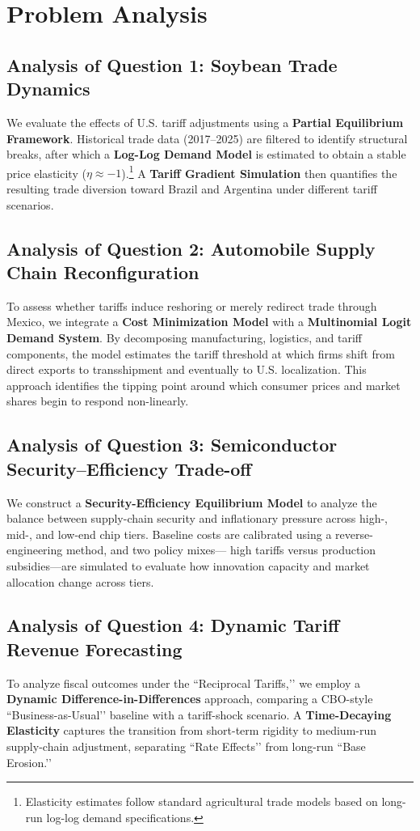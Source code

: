 \documentclass{apmcmthesis}
\begin{document}
\section{Problem Analysis}

\subsection{Analysis of Question 1: Soybean Trade Dynamics}
We evaluate the effects of U.S. tariff adjustments using a 
\textbf{Partial Equilibrium Framework}. Historical trade data (2017–2025) are filtered to
identify structural breaks, after which a \textbf{Log-Log Demand Model} is estimated to obtain a 
stable price elasticity ($\eta \approx -1$).\footnote{Elasticity estimates follow standard
agricultural trade models based on long-run log-log demand specifications.} 
A \textbf{Tariff Gradient Simulation} then quantifies the resulting trade diversion toward Brazil
and Argentina under different tariff scenarios.

\subsection{Analysis of Question 2: Automobile Supply Chain Reconfiguration}
To assess whether tariffs induce reshoring or merely redirect trade through Mexico, we integrate a 
\textbf{Cost Minimization Model} with a \textbf{Multinomial Logit Demand System}. 
By decomposing manufacturing, logistics, and tariff components, the model estimates the tariff 
threshold at which firms shift from direct exports to transshipment and eventually to U.S. 
localization. This approach identifies the tipping point around which consumer prices and market
shares begin to respond non-linearly.

\subsection{Analysis of Question 3: Semiconductor Security–Efficiency Trade-off}
We construct a \textbf{Security-Efficiency Equilibrium Model} to analyze the balance between 
supply-chain security and inflationary pressure across high-, mid-, and low-end chip tiers. 
Baseline costs are calibrated using a reverse-engineering method, and two policy mixes—
high tariffs versus production subsidies—are simulated to evaluate how innovation capacity and 
market allocation change across tiers.

\subsection{Analysis of Question 4: Dynamic Tariff Revenue Forecasting}
To analyze fiscal outcomes under the ``Reciprocal Tariffs,’’ we employ a 
\textbf{Dynamic Difference-in-Differences} approach, comparing a CBO-style “Business-as-Usual’’ 
baseline with a tariff-shock scenario. A \textbf{Time-Decaying Elasticity} captures the transition 
from short-term rigidity to medium-run supply-chain adjustment, separating “Rate Effects’’ from 
long-run “Base Erosion.’’
\end{document}
